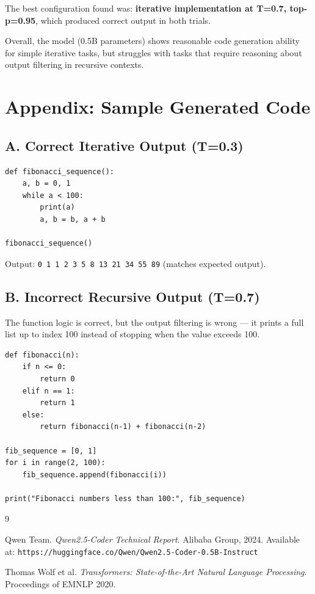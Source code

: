 \documentclass[11pt,a4paper]{article}
\begin{document}
The best configuration found was: \textbf{iterative implementation at T=0.7, top-p=0.95}, which produced correct output in both trials.

Overall, the model (0.5B parameters) shows reasonable code generation ability for simple iterative tasks, but struggles with tasks that require reasoning about output filtering in recursive contexts.

\section*{Appendix: Sample Generated Code}

\subsection*{A. Correct Iterative Output (T=0.3)}

\begin{lstlisting}
def fibonacci_sequence():
    a, b = 0, 1
    while a < 100:
        print(a)
        a, b = b, a + b

fibonacci_sequence()
\end{lstlisting}

Output: \texttt{0 1 1 2 3 5 8 13 21 34 55 89} (matches expected output).

\subsection*{B. Incorrect Recursive Output (T=0.7)}

The function logic is correct, but the output filtering is wrong --- it prints a full list up to index 100 instead of stopping when the value exceeds 100.

\begin{lstlisting}
def fibonacci(n):
    if n <= 0:
        return 0
    elif n == 1:
        return 1
    else:
        return fibonacci(n-1) + fibonacci(n-2)

fib_sequence = [0, 1]
for i in range(2, 100):
    fib_sequence.append(fibonacci(i))

print("Fibonacci numbers less than 100:", fib_sequence)
\end{lstlisting}

\begin{thebibliography}{9}

Qwen Team.
\textit{Qwen2.5-Coder Technical Report}.
Alibaba Group, 2024.
Available at: \texttt{https://huggingface.co/Qwen/Qwen2.5-Coder-0.5B-Instruct}

Thomas Wolf et al.
\textit{Transformers: State-of-the-Art Natural Language Processing}.
Proceedings of EMNLP 2020.

\end{thebibliography}
\end{document}
